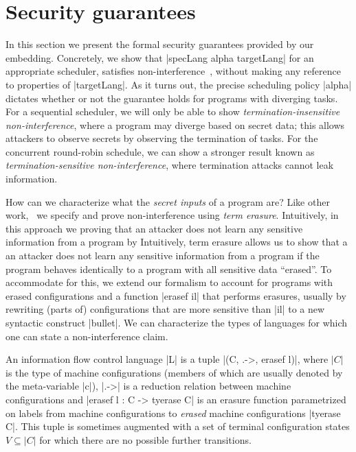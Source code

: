 \section{Security guarantees}
\label{sec:formal}

In this section we present the formal security guarantees provided by
our embedding.
%
Concretely, we show that |specLang alpha targetLang| for an appropriate
scheduler, satisfies non-interference~\tocite{},
without making any reference to properties of |targetLang|.
%
As it turns out, the precise scheduling policy |alpha| dictates
whether or not the guarantee holds for programs with diverging tasks.
For a sequential scheduler, we will only be able to show
\emph{termination-insensitive non-interference}, where a program
may diverge based on secret data; this allows attackers to observe
secrets by observing the termination of tasks.
For the concurrent round-robin schedule,
we can show a stronger result known as
\emph{termination-sensitive non-interference},
where termination attacks cannot leak information.

How can we characterize what the \emph{secret inputs} of a program
are?  Like other work,~\tocite{} we specify and prove
non-interference using \emph{term erasure}.
%
Intuitively, in this approach we proving that an attacker does not learn
any sensitive information from a program by 
Intuitively, term erasure allows us to show that a an
attacker does not learn any sensitive information from a program if the
program behaves identically to a program with all sensitive data ``erased''.
%
To accommodate for this, we extend our formalism to account for
programs with erased configurations and a function |erasef il| that
performs erasures, usually by rewriting (parts of) configurations that
are more sensitive than |il| to a new syntactic construct |bullet|.
%
We can characterize the types of languages for which one can state
a non-interference claim.

\begin{definition}
    An information flow control language |L| is a tuple |(C, .->,
    erasef l)|, where $|C|$ is the type of machine configurations (members
    of which are usually denoted by the meta-variable |c|), |.->| is a
    reduction relation between machine configurations and |erasef l : C -> tyerase C|
    is an erasure function parametrized on labels from machine configurations to \emph{erased} machine
    configurations |tyerase C|.  This tuple is sometimes
    augmented with a set of terminal configuration states $V
    \subseteq |C|$ for which there are no possible further transitions.
\end{definition}

